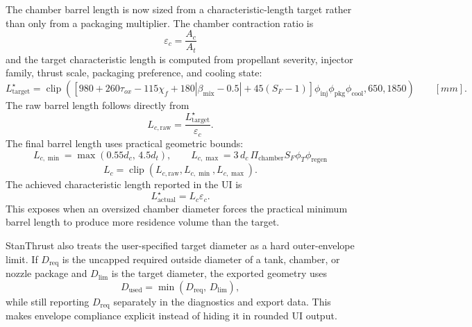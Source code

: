 \documentclass[11pt]{article}
\newcommand{\clip}{\operatorname{clip}}
\begin{document}
The chamber barrel length is now sized from a characteristic-length target rather than only from a packaging multiplier. The chamber contraction ratio is
\begin{equation}
\varepsilon_c=\frac{A_c}{A_t}
\label{eq:chamber-contraction-ratio}
\end{equation}
and the target characteristic length is computed from propellant severity, injector family, thrust scale, packaging preference, and cooling state:
\begin{equation}
L^\star_{\text{target}}
=
\clip\!\left(
\left[
980
+260\tau_{ox}
-115\chi_f
+180\left|\beta_{\text{mix}}-0.5\right|
+45(S_F-1)
\right]\phi_{\text{inj}}\phi_{\text{pkg}}\phi_{\text{cool}},
650,
1850
\right)
\qquad [\si{mm}].
\label{eq:chamber-lstar-target}
\end{equation}
The raw barrel length follows directly from
\begin{equation}
L_{c,\text{raw}}=\frac{L^\star_{\text{target}}}{\varepsilon_c}.
\label{eq:chamber-lstar-raw-length}
\end{equation}
The final barrel length uses practical geometric bounds:
\begin{equation}
L_{c,\min}=\max(0.55d_c,\,4.5d_t),
\qquad
L_{c,\max}=3\,d_c\,\Pi_{\text{chamber}}S_F\phi_T\phi_{\text{regen}}
\label{eq:chamber-lstar-bounds}
\end{equation}
\begin{equation}
L_c=\clip(L_{c,\text{raw}},L_{c,\min},L_{c,\max}).
\label{eq:chamber-length}
\end{equation}
The achieved characteristic length reported in the UI is
\begin{equation}
L^\star_{\text{actual}}=L_c\varepsilon_c.
\label{eq:chamber-lstar-actual}
\end{equation}
This exposes when an oversized chamber diameter forces the practical minimum barrel length to produce more residence volume than the target.

StanThrust also treats the user-specified target diameter as a hard outer-envelope limit. If $D_{\text{req}}$ is the uncapped required outside diameter of a tank, chamber, or nozzle package and $D_{\text{lim}}$ is the target diameter, the exported geometry uses
\begin{equation}
D_{\text{used}}=\min\!\left(D_{\text{req}},\,D_{\text{lim}}\right),
\label{eq:diameter-cap}
\end{equation}
while still reporting $D_{\text{req}}$ separately in the diagnostics and export data. This makes envelope compliance explicit instead of hiding it in rounded UI output.
\end{document}
